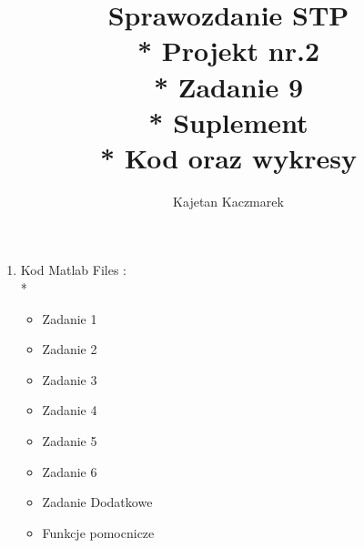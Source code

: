 \documentclass[a4paper, 11pt]{article}
\author{Kajetan Kaczmarek}
\begin{document}
\title{Sprawozdanie STP \\* Projekt nr.2 \\* 
Zadanie 9 \\* Suplement \\* Kod oraz wykresy}
\maketitle
\begin{enumerate}
\item Kod
Matlab Files : \\*
\begin{itemize}

\item Zadanie 1
  

  
\item Zadanie 2
  
\item Zadanie 3
  

  

  
\item Zadanie 4
  

  

  

  
\item Zadanie 5
  

\item Zadanie 6
  

  

  
\item Zadanie Dodatkowe
  
\item Funkcje pomocnicze

  

  

  

  

  

  


\end{itemize}
\end{enumerate}
\end{document}
